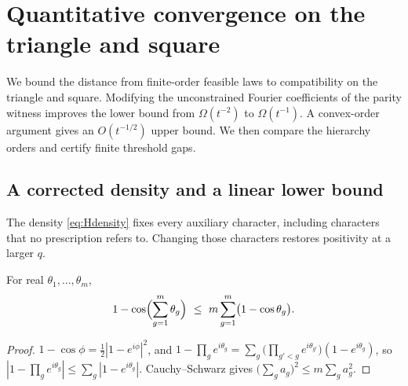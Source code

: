 \section{Quantitative convergence on the triangle and square}\label{sec:cyclequant}

We bound the distance from finite-order feasible laws to compatibility on the triangle and square. Modifying the unconstrained Fourier coefficients of the parity witness improves the lower bound from $\Omega(t^{-2})$ to $\Omega(t^{-1})$. A convex-order argument gives an $O(t^{-1/2})$ upper bound. We then compare the hierarchy orders and certify finite threshold gaps.

\subsection{A corrected density and a linear lower bound}\label{sec:corrected}

The density \eqref{eq:Hdensity} fixes every auxiliary character, including characters that no prescription refers to. Changing those characters restores positivity at a larger $q$.

\begin{lemma}\label{lem:telescope}
For real $\theta_1,\dots,\theta_m$,
\[
1-\cos\Bigl(\sum_{g=1}^m\theta_g\Bigr)\ \le\ m\sum_{g=1}^m\bigl(1-\cos\theta_g\bigr).
\]
\end{lemma}

\begin{proof}
$1-\cos\phi=\tfrac12|1-e^{i\phi}|^2$, and
$1-\prod_ge^{i\theta_g}=\sum_g\bigl(\prod_{g'<g}e^{i\theta_{g'}}\bigr)(1-e^{i\theta_g})$,
so $|1-\prod_ge^{i\theta_g}|\le\sum_g|1-e^{i\theta_g}|$. Cauchy--Schwarz gives $\bigl(\sum_g a_g\bigr)^2\le m\sum_ga_g^2$.
\end{proof}

